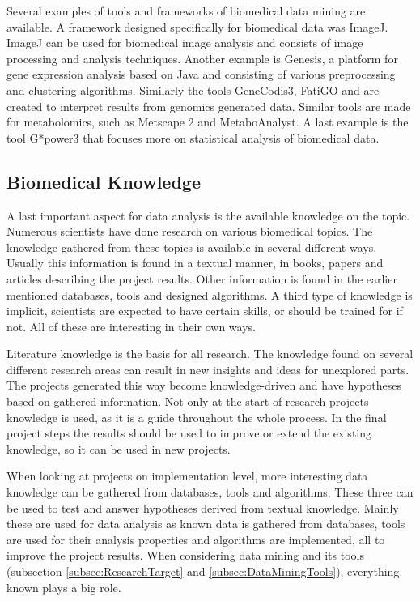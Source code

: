 \documentclass[10pt,a4paper]{article}
\begin{document}
	Several examples of tools and frameworks of biomedical data mining are available. A framework designed specifically for biomedical data was ImageJ\cite{schindelin2015imagej}. ImageJ can be used for biomedical image analysis and consists of image processing and analysis techniques. Another example is Genesis\cite{sturn2002genesis}, a platform for gene expression analysis based on Java and consisting of various preprocessing and clustering algorithms. Similarly the tools GeneCodis3\cite{tabas2012genecodis3}, FatiGO\cite{al2004fatigo} and \cite{zeeberg2003gominer} are created to interpret results from genomics generated data. Similar tools are made for metabolomics, such as Metscape 2\cite{karnovsky2011metscape} and MetaboAnalyst\cite{xia2015metaboanalyst}. A last example is the tool G*power3\cite{faul2007g} that focuses more on statistical analysis of biomedical data.
	

	
	\subsection{Biomedical Knowledge}
	
	A last important aspect for data analysis is the available knowledge on the topic. Numerous scientists have done research on various biomedical topics. The knowledge gathered from these topics is available in several different ways\cite{bellazzi2011data}. Usually this information is found in a textual manner, in books, papers and articles describing the project results. Other information is found in the earlier mentioned databases, tools and designed algorithms. A third type of knowledge is implicit, scientists are expected to have certain skills, or should be trained for if not\cite{zupan2006knowledge}. All of these are interesting in their own ways.
	
	Literature knowledge is the basis for all research. The knowledge found on several different research areas can result in new insights and ideas for unexplored parts. The projects generated this way become knowledge-driven and have hypotheses based on gathered information\cite{bellazzi2011data}. Not only at the start of research projects knowledge is used, as it is a guide throughout the whole process. In the final project steps the results should be used to improve or extend the existing knowledge, so it can be used in new projects\cite{zupan2006knowledge}.
	
	When looking at projects on implementation level, more interesting data knowledge can be gathered from databases, tools and algorithms. These three can be used to test and answer hypotheses derived from textual knowledge. Mainly these are used for data analysis as known data is gathered from databases, tools are used for their analysis properties and algorithms are implemented, all to improve the project results. When considering data mining and its tools (subsection \ref{subsec:ResearchTarget} and \ref{subsec:DataMiningTools}), everything known plays a big role\cite{bellazzi2011data}.
	
\end{document}

